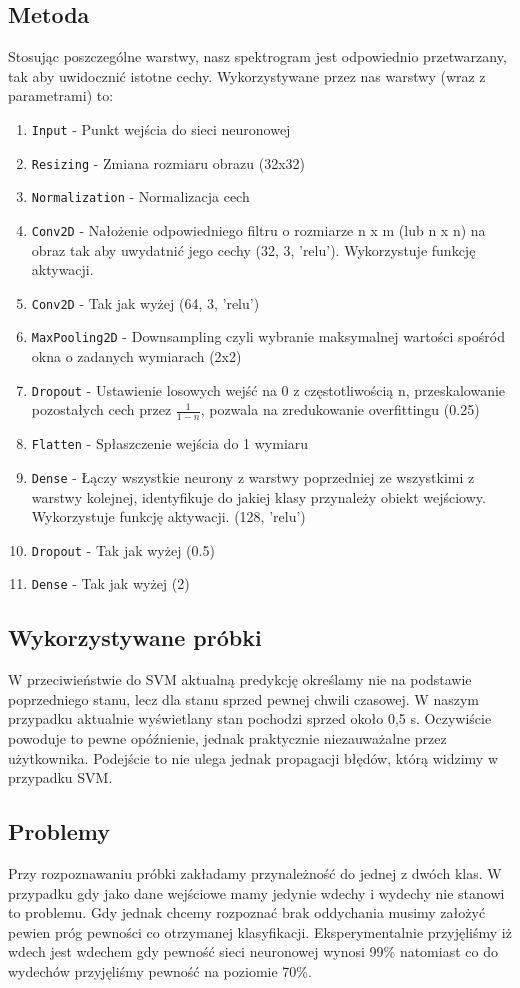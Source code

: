 \documentclass[polish]{article}
\begin{document}
\subsection{Metoda}
Stosując poszczególne warstwy, nasz spektrogram jest odpowiednio przetwarzany, tak aby uwidocznić istotne cechy. Wykorzystywane przez nas warstwy (wraz z parametrami) to:
\begin{enumerate}
  \item\texttt{Input} - Punkt wejścia do sieci neuronowej
  \item\texttt{Resizing} - Zmiana rozmiaru obrazu (32x32)
  \item\texttt{Normalization} - Normalizacja cech
  \item\texttt{Conv2D} - Nałożenie odpowiedniego filtru o rozmiarze n x m (lub n x n) na obraz tak aby uwydatnić jego cechy (32, 3, 'relu'). Wykorzystuje funkcję aktywacji.
  \item\texttt{Conv2D} - Tak jak wyżej (64, 3, 'relu')
  \item\texttt{MaxPooling2D} - Downsampling czyli wybranie maksymalnej wartości spośród okna o zadanych wymiarach (2x2)
  \item\texttt{Dropout} - Ustawienie losowych wejść na 0 z częstotliwością n, przeskalowanie pozostałych cech przez 
  $\frac{1}{1-n}$, pozwala na zredukowanie overfittingu (0.25)
  \item\texttt{Flatten} - Spłaszczenie wejścia do 1 wymiaru
  \item\texttt{Dense} - Łączy wszystkie neurony z warstwy poprzedniej ze wszystkimi z warstwy kolejnej, identyfikuje do jakiej klasy przynależy obiekt wejściowy. Wykorzystuje funkcję aktywacji. (128, 'relu')
  \item\texttt{Dropout} - Tak jak wyżej (0.5)
  \item\texttt{Dense} - Tak jak wyżej (2)
\end{enumerate}

\subsection{Wykorzystywane próbki}
W przeciwieństwie do SVM aktualną predykcję określamy nie na podstawie poprzedniego stanu, lecz dla stanu sprzed pewnej chwili czasowej. W naszym przypadku aktualnie wyświetlany stan pochodzi sprzed około 0,5 \unit{s}. Oczywiście powoduje to pewne opóźnienie, jednak praktycznie niezauważalne przez użytkownika. Podejście to nie ulega jednak propagacji błędów, którą widzimy w przypadku SVM.
\subsection{Problemy}
Przy rozpoznawaniu próbki zakładamy przynależność do jednej z dwóch klas. W przypadku gdy jako dane wejściowe mamy jedynie wdechy i wydechy nie stanowi to problemu. Gdy jednak chcemy rozpoznać brak oddychania musimy założyć pewien próg pewności co otrzymanej klasyfikacji. Eksperymentalnie przyjęliśmy iż wdech jest wdechem gdy pewność sieci neuronowej wynosi 99\% natomiast co do wydechów przyjęliśmy pewność na poziomie 70\%. 
\end{document}
